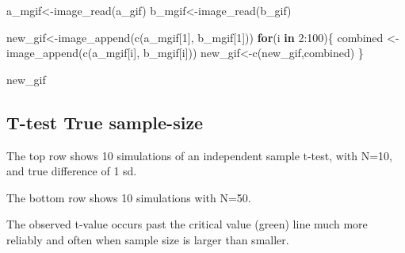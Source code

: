 \documentclass[
  letterpaper,
  DIV=11,
  numbers=noendperiod]{scrreprt}
\newenvironment{Shaded}{\begin{snugshade}}{\end{snugshade}}
\newcommand{\ControlFlowTok}[1]{\textcolor[rgb]{0.00,0.23,0.31}{\textbf{#1}}}
\newcommand{\DecValTok}[1]{\textcolor[rgb]{0.68,0.00,0.00}{#1}}
\newcommand{\FunctionTok}[1]{\textcolor[rgb]{0.28,0.35,0.67}{#1}}
\newcommand{\NormalTok}[1]{\textcolor[rgb]{0.00,0.23,0.31}{#1}}
\newcommand{\OtherTok}[1]{\textcolor[rgb]{0.00,0.23,0.31}{#1}}
\newcommand{\SpecialCharTok}[1]{\textcolor[rgb]{0.37,0.37,0.37}{#1}}
\begin{document}
\begin{Shaded}
\begin{Highlighting}[]
\NormalTok{a\_mgif}\OtherTok{\textless{}{-}}\FunctionTok{image\_read}\NormalTok{(a\_gif)}
\NormalTok{b\_mgif}\OtherTok{\textless{}{-}}\FunctionTok{image\_read}\NormalTok{(b\_gif)}

\NormalTok{new\_gif}\OtherTok{\textless{}{-}}\FunctionTok{image\_append}\NormalTok{(}\FunctionTok{c}\NormalTok{(a\_mgif[}\DecValTok{1}\NormalTok{], b\_mgif[}\DecValTok{1}\NormalTok{]))}
\ControlFlowTok{for}\NormalTok{(i }\ControlFlowTok{in} \DecValTok{2}\SpecialCharTok{:}\DecValTok{100}\NormalTok{)\{}
\NormalTok{  combined }\OtherTok{\textless{}{-}} \FunctionTok{image\_append}\NormalTok{(}\FunctionTok{c}\NormalTok{(a\_mgif[i], b\_mgif[i]))}
\NormalTok{  new\_gif}\OtherTok{\textless{}{-}}\FunctionTok{c}\NormalTok{(new\_gif,combined)}
\NormalTok{\}}

\NormalTok{new\_gif}
\end{Highlighting}
\end{Shaded}

\subsection{T-test True sample-size}\label{t-test-true-sample-size}

The top row shows 10 simulations of an independent sample t-test, with
N=10, and true difference of 1 sd.

The bottom row shows 10 simulations with N=50.

The observed t-value occurs past the critical value (green) line much
more reliably and often when sample size is larger than smaller.
\end{document}
